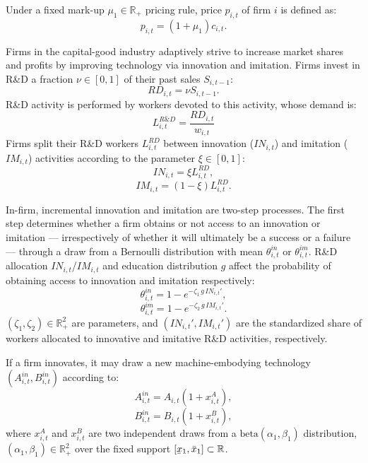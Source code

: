 \documentclass[a4paper,11pt]{article}
\newcommand\munderbar[1]{%
	\underaccent{\bar}{#1}}
\begin{document}
\begin{appendices}
Under a fixed mark-up $\mu_1 \in \mathbb{R}_+$ pricing rule, price $p_{i,t}$ of firm $i$ is defined as:
\begin{equation}
	p_{i,t} = ( 1 + \mu_1 ) c_{i,t}.
\end{equation}

Firms in the capital-good industry adaptively strive to increase market shares and profits by improving technology via innovation and imitation. Firms invest in R\&D a fraction $\nu \in [0,1]$ of their past sales $S_{i,t-1}$:
\begin{equation}
	RD_{i,t} = \nu S_{i,t-1}.
\end{equation}
R\&D activity is performed by workers devoted to this activity, whose demand is:
\begin{equation}
	L_{i,t}^{R \& D} = \frac{ RD_{i,t} }{ w_{i,t} }
\end{equation}
Firms split their R\&D workers $L_{i,t}^{RD}$ between innovation (${IN}_{i,t}$) and imitation (${IM}_{i,t}$) activities according to the parameter $\xi \in [0,1]$:
\begin{equation}
	IN_{i,t} = \xi L_{i,t}^{RD},
	\label{innoL}
\end{equation}
\begin{equation}
	IM_{i,t} = ( 1 - \xi ) L_{i,t}^{RD}.
	\label{imiL}
\end{equation}

In-firm, incremental innovation and imitation are two-step processes. The first step determines whether a firm obtains or not access to an innovation or imitation — irrespectively of whether it will ultimately be a success or a failure — through a draw from a Bernoulli distribution with mean $\theta_{i,t}^{in}$ or $\theta_{i,t}^{im}$. R\&D allocation $IN_{i,t}$/$IM_{i,t}$ and education distribution $g$ affect the probability of obtaining access to innovation and imitation respectively:
\begin{equation}
	\theta_{i,t}^{in} = 1 - e^{ -\zeta_1 \, g \, IN_{i,t}' },
	\label{innoProb}
\end{equation}
\begin{equation}
	\theta_{i,t}^{im} = 1 - e^{ -\zeta_2 \, g \, IM_{i,t}' }.
	\label{imiProb}
\end{equation}
$(\zeta_1, \zeta_2) \in \mathbb{R}_+^2$ are parameters, and $(IN_{i,t}', IM_{i,t}')$ are the standardized share of workers allocated to innovative and imitative R\&D activities, respectively.

If a firm innovates, it may draw a new machine-embodying technology $(A_{i,t}^{in}, B_{i,t}^{in})$ according to:
\begin{equation}
	A_{i,t}^{in} = A_{i,t} \left( 1 + x_{i,t}^A \right),
\end{equation}
\begin{equation}
	B_{i,t}^{in} = B_{i,t} \left(  1 + x_{i,t}^B \right),
\end{equation}
where $x_{i,t}^A$ and $x_{i,t}^B$ are two independent draws from a $\mathrm{beta}{(\alpha_1,\beta_1)}$ distribution, $(\alpha_1,\beta_1) \in \mathbb{R}^2_+$ over the fixed support $[\munderbar{x}_1,\bar{x}_1] \subset \mathbb{R}$.


\end{appendices}
\end{document}
